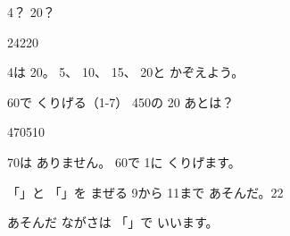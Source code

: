 \begin{tsumazuki}{\mbox{4}？ \mbox{20}？}
\noindent\begin{minipage}[c]{0.78\linewidth}
\bkbatsu\enspace \mbox{24}\hspace{3\zw}\bkmaru\enspace \mbox{220}\par
4は \mbox{20}。 5、 10、 15、 20と かぞえよう。
\end{minipage}\hfill
\begin{minipage}[c]{0.2\linewidth}\centering
{}
\end{minipage}
\end{tsumazuki}

\begin{tsumazuki}{60で くりげる（1-7）}
\mbox{450}の \mbox{20} あとは？\par
\bkbatsu\enspace \mbox{470}\hspace{3\zw}\bkmaru\enspace \mbox{510}\par
\mbox{70}は ありません。 \mbox{60}で \mbox{1}に くりげます。
\end{tsumazuki}

\begin{tsumazuki}{「」と 「」を まぜる}
\mbox{9}から \mbox{11}まで あそんだ。\hspace{1\zw}\bkbatsu\enspace \mbox{2}\hspace{2\zw}\bkmaru\enspace \mbox{2}\par
あそんだ ながさは 「」で いいます。
\end{tsumazuki}



